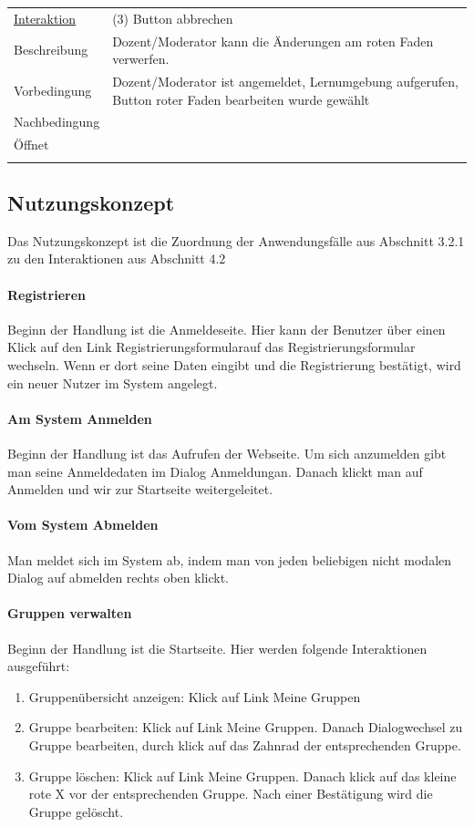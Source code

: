 \documentclass[12pt,a4paper]{article}
\begin{document}
{\begin{tabular}{l p{12cm}}
\underline{Interaktion} & (3) Button abbrechen   \\ 
Beschreibung   	 		& Dozent/Moderator kann die Änderungen am roten Faden verwerfen.\\
Vorbedingung	 		& Dozent/Moderator ist angemeldet, Lernumgebung aufgerufen, Button roter Faden bearbeiten wurde gewählt\\
Nachbedingung	 		& \\
Öffnet			 		& \\\\
\end{tabular}

\subsection{Nutzungskonzept}
Das Nutzungskonzept ist die Zuordnung der Anwendungsfälle aus Abschnitt 3.2.1 zu den Interaktionen aus Abschnitt 4.2
\paragraph{Registrieren}
Beginn der Handlung ist die Anmeldeseite. Hier kann der Benutzer über einen Klick auf den Link \glqq Registrierungsformular\grqq auf das Registrierungsformular wechseln. Wenn er dort seine Daten eingibt und die Registrierung bestätigt, wird ein neuer Nutzer im System angelegt.

\paragraph{Am System Anmelden}
Beginn der Handlung ist das Aufrufen der Webseite. Um sich anzumelden gibt man seine Anmeldedaten im Dialog \glqq Anmeldung\grqq  an. Danach klickt man auf Anmelden und wir zur Startseite weitergeleitet.

\paragraph{Vom System Abmelden}
Man meldet sich im System ab, indem man von jeden beliebigen nicht modalen Dialog auf abmelden rechts oben klickt.

\paragraph{Gruppen verwalten}
Beginn der Handlung ist die Startseite. Hier werden folgende Interaktionen ausgeführt:
\begin{enumerate}
	\item \glqq Gruppenübersicht anzeigen\grqq: Klick auf Link \glqq Meine Gruppen\grqq
	\item \glqq Gruppe bearbeiten\grqq: Klick auf Link \glqq Meine Gruppen\grqq . Danach Dialogwechsel zu  \glqq Gruppe bearbeiten\grqq, durch klick auf das Zahnrad der entsprechenden Gruppe.
	\item \glqq Gruppe löschen\grqq: Klick auf Link \glqq Meine Gruppen\grqq . Danach klick auf das kleine rote X vor der entsprechenden Gruppe. Nach einer Bestätigung wird die Gruppe gelöscht.
\end{enumerate}

}
\end{document}
